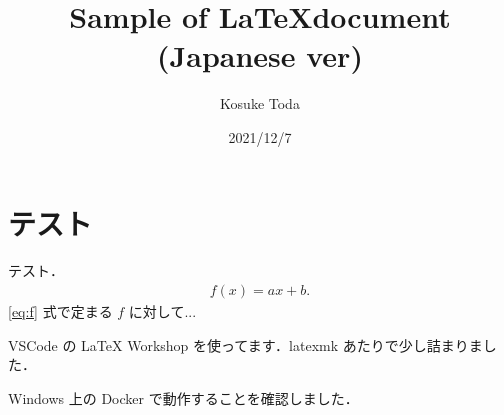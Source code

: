 \documentclass[dvipdfmx]{jsarticle}
\begin{document}
    \title{Sample of \LaTeX document (Japanese ver)}
    \author{Kosuke Toda}
    \date{2021/12/7}
    \maketitle

    \section{テスト}
    テスト．
    \begin{align}
        f(x) = ax + b. \label{eq:f}
    \end{align}
    \eqref{eq:f} 式で定まる $f$ に対して...

    VSCode の LaTeX Workshop を使ってます．latexmk あたりで少し詰まりました．

    Windows 上の Docker で動作することを確認しました．
\end{document}
